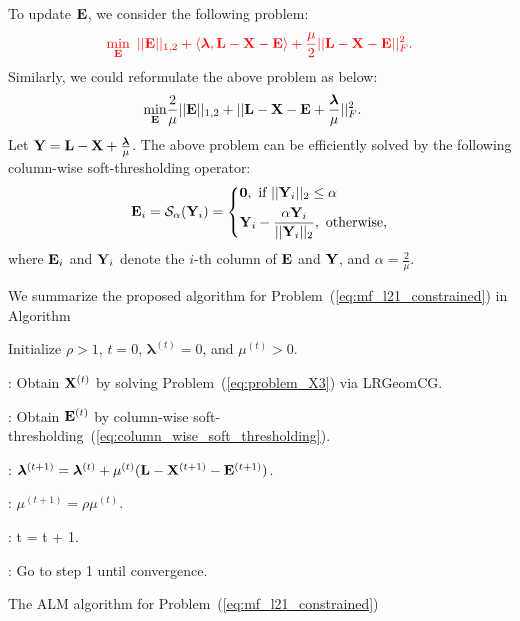 \documentclass[letterpaper]{article}
\def\bE{{\bf E}}
\def\blambda{{\bm \lambda}}
\def\calS{{\mathcal{S}}}
\def\bL{{\bf L}}
\def\bX{{\bf X}}
\def\bX{{\bf X}}
\def\bY{{\bf Y}}
\def\zerocolumn{{\bf 0}}
\def\yanred{\textcolor{red}}
\begin{document}
To update $\bE$, we consider the following problem:
\begin{align}\label{eq:problem_E}
  \yanred{
  \min_{\bE} ~ || \bE ||_{1,2} + \langle \blambda, \bL - \bX - \bE \rangle + \frac{\mu}{2} || \bL - \bX - \bE ||_F^2   .
  }
\end{align}
\noindent
Similarly, we could reformulate the above problem as below:
\begin{align}\label{eq:problem_E2}
  \min_{\bE} & \frac{2}{\mu} || \bE ||_{1,2} + || \bL - \bX - \bE + \frac{\blambda}{\mu} ||_F^2    .
\end{align}
\noindent
Let $\bY = \bL - \bX + \frac{\blambda}{\mu}$.
The above problem can be efficiently solved by the following column-wise soft-thresholding operator:
\begin{align}\label{eq:column_wise_soft_thresholding}
  \bE_{i} = \calS_{\alpha}(\bY_{i}) = \left\{
    \begin{aligned}
      & \zerocolumn,~\text{if}~ ||\bY_{i}||_2 \leq \alpha   \\
      & \bY_{i} - \frac{\alpha \bY_{i}}{|| \bY_{i} ||_2},~\text{otherwise,}
    \end{aligned}
    \right.
\end{align}
\noindent
where $\bE_{i}$ and $\bY_{i}$ denote the $i$-th column of $\bE$ and $\bY$,
and $\alpha = \frac{2}{\mu}$.



We summarize the proposed algorithm for Problem~(\ref{eq:mf_l21_constrained}) in Algorithm~\
\begin{algorithm}[h!]
\begin{algorithmic}
\STATE Initialize $\rho > 1$, $t = 0$, $\blambda^{(t)} = 0$, and $\mu^{(t)} > 0$.

: Obtain $\bX^{(t)}$ by solving Problem~(\ref{eq:problem_X3}) via LRGeomCG.

: Obtain $\bE^{(t)}$ by column-wise soft-thresholding~(\ref{eq:column_wise_soft_thresholding}).

: $\blambda^{(t+1)} = \blambda^{(t)} + \mu^{(t)} (\bL - \bX^{(t+1)} - \bE^{(t+1)})$.

: $\mu^{(t+1)} = \rho \mu^{(t)}$.

: t = t + 1.

: Go to step 1 until convergence.

\end{algorithmic}
\caption{The ALM algorithm for Problem~(\ref{eq:mf_l21_constrained})} \label{Alg:overview_alm}
\end{algorithm}
\end{document}
